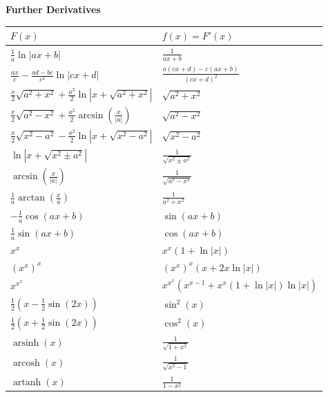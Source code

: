 \vspace{2pt}
{\small
\renewcommand{\arraystretch}{0.8}
\setlength{\tabcolsep}{4pt}
\begin{center}
\textbf{Further Derivatives}\\[2pt]
\begin{tabular}{>{\raggedright\arraybackslash}p{}|>{\raggedright\arraybackslash}p{}}
$F(x)$ & $f(x)=F'(x)$\\
\hline
$\frac1a\ln|ax+b|$ & $\frac1{ax+b}$\\[2pt]
$\frac{ax}{c}-\frac{ad-bc}{c^2}\ln|cx+d|$ & $\frac{a(cx+d)-c(ax+b)}{(cx+d)^2}$\\[2pt]
$\frac{x}{2}\sqrt{a^2+x^2}+\frac{a^2}{2}\ln|x+\sqrt{a^2+x^2}|$ & $\sqrt{a^2+x^2}$\\[2pt]
$\frac{x}{2}\sqrt{a^2-x^2}+\frac{a^2}{2}\arcsin\!\left(\frac{x}{|a|}\right)$ & $\sqrt{a^2-x^2}$\\[2pt]
$\frac{x}{2}\sqrt{x^2-a^2}-\frac{a^2}{2}\ln|x+\sqrt{x^2-a^2}|$ & $\sqrt{x^2-a^2}$\\[2pt]
$\ln|x+\sqrt{x^2\pm a^2}|$ & $\frac1{\sqrt{x^2\pm a^2}}$\\[2pt]
$\arcsin\!\left(\frac{x}{|a|}\right)$ & $\frac1{\sqrt{a^2-x^2}}$\\[2pt]
$\frac1a\arctan\!\left(\frac{x}{a}\right)$ & $\frac1{a^2+x^2}$\\[2pt]
\hline
$-\frac1a\cos(ax+b)$ & $\sin(ax+b)$\\[2pt]
$\frac1a\sin(ax+b)$ & $\cos(ax+b)$\\[2pt]
\hline
$x^x$ & $x^x(1+\ln|x|)$\\[2pt]
$(x^x)^x$ & $(x^x)^x(x+2x\ln|x|)$\\[2pt]
$x^{x^x}$ & $x^{x^x}\!\left(x^{x-1}+x^x(1+\ln|x|)\ln|x|\right)$\\[2pt]
\hline
$\frac12\left(x-\frac12\sin(2x)\right)$ & $\sin^2(x)$\\[2pt]
$\frac12\left(x+\frac12\sin(2x)\right)$ & $\cos^2(x)$\\[2pt]
\hline
$\operatorname{arsinh}(x)$ & $\frac1{\sqrt{1+x^2}}$\\[2pt]
$\operatorname{arcosh}(x)$ & $\frac1{\sqrt{x^2-1}}$\\[2pt]
$\operatorname{artanh}(x)$ & $\frac1{1-x^2}$\\
\end{tabular}
\end{center}
}

